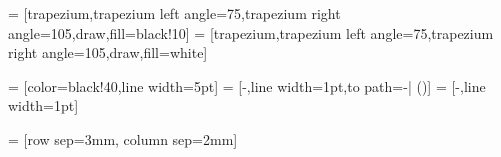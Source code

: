  = [trapezium,trapezium left angle=75,trapezium right angle=105,draw,fill=black!10]
 = [trapezium,trapezium left angle=75,trapezium right angle=105,draw,fill=white]


%

 = [color=black!40,line width=5pt]
 = [-,line width=1pt,to path={-| (\tikztotarget)}]
 = [-,line width=1pt]


 = [row sep=3mm, column sep=2mm]


\newcommand{\MultilineComponent}[3]
{
    \begin{minipage}{#1}
    \begin{center}
        #2 \linebreak #3
    \end{center}
    \end{minipage}
}

\newcommand{\MultiColumnComponent}[5]
{
    \begin{minipage}{#1}
    \begin{center}
    #2 \linebreak #3
    \end{center}
    \begin{minipage}{0.49\textwidth}
    \begin{center}
    #4
    \end{center}
    \end{minipage}
    \begin{minipage}{0.49\textwidth}
    \begin{center}
    #5
    \end{center}
    \end{minipage}
    \end{minipage}
}